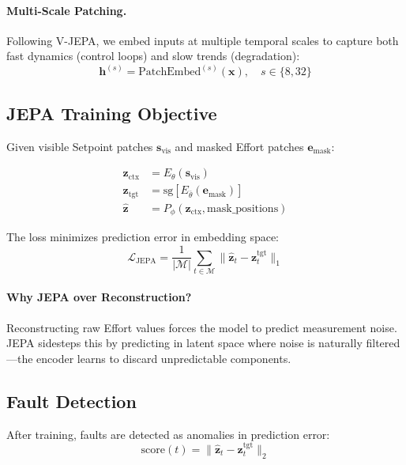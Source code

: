 \documentclass{article}
\begin{document}
\paragraph{Multi-Scale Patching.} Following V-JEPA, we embed inputs at multiple temporal scales to capture both fast dynamics (control loops) and slow trends (degradation):
\begin{equation}
    \mathbf{h}^{(s)} = \text{PatchEmbed}^{(s)}(\mathbf{x}), \quad s \in \{8, 32\}
\end{equation}

\subsection{JEPA Training Objective}

Given visible Setpoint patches $\mathbf{s}_{\text{vis}}$ and masked Effort patches $\mathbf{e}_{\text{mask}}$:

\begin{align}
    \mathbf{z}_{\text{ctx}} &= E_\theta(\mathbf{s}_{\text{vis}}) \\
    \mathbf{z}_{\text{tgt}} &= \text{sg}[E_{\bar{\theta}}(\mathbf{e}_{\text{mask}})] \\
    \hat{\mathbf{z}} &= P_\phi(\mathbf{z}_{\text{ctx}}, \text{mask\_positions})
\end{align}

The loss minimizes prediction error in embedding space:
\begin{equation}
    \mathcal{L}_{\text{JEPA}} = \frac{1}{|\mathcal{M}|} \sum_{t \in \mathcal{M}} \|\hat{\mathbf{z}}_t - \mathbf{z}^{\text{tgt}}_t\|_1
\end{equation}

\paragraph{Why JEPA over Reconstruction?} Reconstructing raw Effort values forces the model to predict measurement noise. JEPA sidesteps this by predicting in latent space where noise is naturally filtered—the encoder learns to discard unpredictable components.

\subsection{Fault Detection}

After training, faults are detected as anomalies in prediction error:
\begin{equation}
    \text{score}(t) = \|\hat{\mathbf{z}}_t - \mathbf{z}^{\text{tgt}}_t\|_2
\end{equation}
\end{document}
